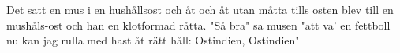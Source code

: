\vspace{10pt}
Det satt en mus i en hushållsost
och åt och åt utan måtta
tills osten blev till en mushåls-ost
och han en klotformad råtta.
"Så bra" sa musen "att va' en fettboll
nu kan jag rulla med hast åt rätt håll:
Ostindien, Ostindien"